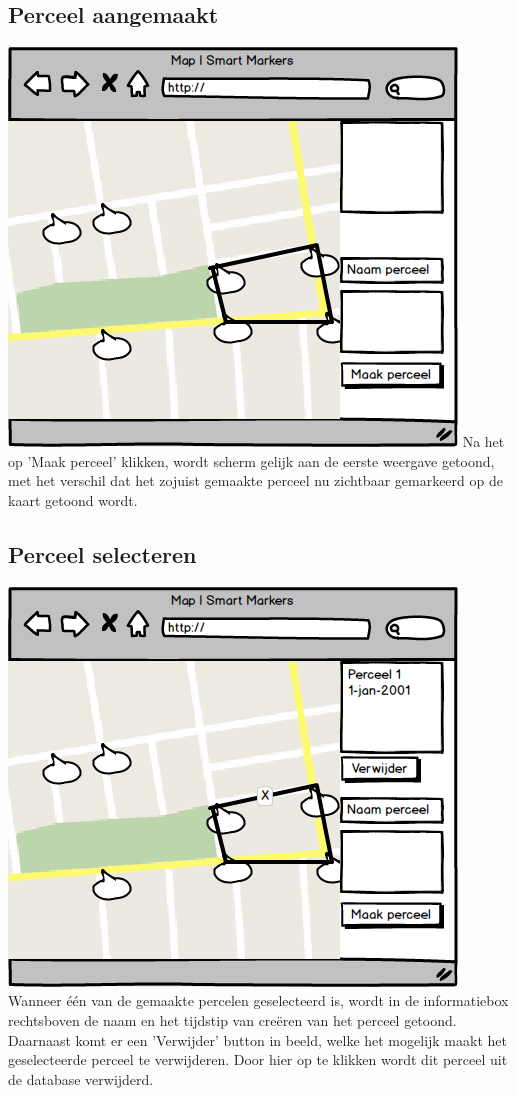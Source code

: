 \subsection*{Perceel aangemaakt}
\includegraphics{functional/map_4.png}
Na het op 'Maak perceel' klikken, wordt scherm gelijk aan de eerste weergave
getoond, met het verschil dat het zojuist gemaakte perceel nu zichtbaar gemarkeerd
op de kaart getoond wordt.

\subsection*{Perceel selecteren}
\includegraphics{functional/map_5.png}
Wanneer één van de gemaakte percelen geselecteerd is, wordt in de informatiebox
rechtsboven de naam en het tijdstip van creëren van het perceel getoond.
Daarnaast komt er een 'Verwijder' button in beeld, welke het mogelijk maakt het
geselecteerde perceel te verwijderen. Door hier op te klikken wordt dit perceel
uit de database verwijderd.
